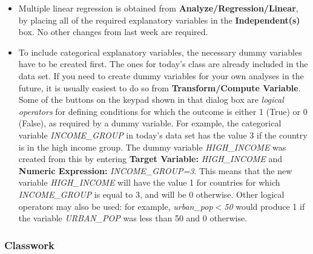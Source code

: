 \begin{itemize}
\item
Multiple linear regression is obtained from
\textbf{Analyze/Regression/Linear}, by placing all of the
required explanatory variables in the \textbf{Independent(s)} box. No
other changes from last week are required.
\item
To include categorical explanatory variables, the necessary
dummy variables have to be created first. The ones for today's
class are already included in the data set. If you need to create dummy
variables for your own analyses in the future, it is usually
easiest to do so from \textbf{Transform/Compute Variable}.
Some of the buttons on the keypad shown
in that dialog box are \emph{logical operators} for defining conditions for which the outcome is either 1
(True) or 0 (False), as required by a dummy variable. For example, the
categorical variable \emph{INCOME\_GROUP} in today's data set has the value 3
if the country is in the high income group. The dummy variable \emph{HIGH\_INCOME} was created
from this by entering \textbf{Target Variable:} \emph{HIGH\_INCOME} and \textbf{Numeric
Expression:} \emph{INCOME\_GROUP=3}. This means that the new
variable \emph{HIGH\_INCOME} will have the value 1 for countries for which
\emph{INCOME\_GROUP} is equal to 3, and will be 0 otherwise.
Other logical operators may also be used: for example,
\emph{urban\_pop$<$50} would produce 1 if the variable
\emph{URBAN\_POP} was less than
50 and 0 otherwise.
\end{itemize}


\subsubsection{Classwork}


